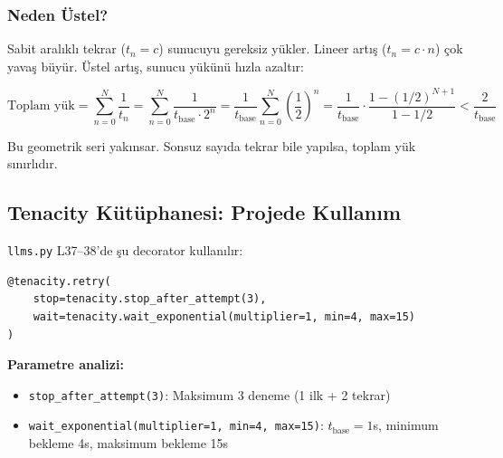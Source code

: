 \subsubsection{Neden \"{U}stel?}

Sabit aral{\i}kl{\i} tekrar ($t_n = c$) sunucuyu gereksiz y\"{u}kler. Lineer art{\i}\c{s} ($t_n = c \cdot n$) \c{c}ok yava\c{s} b\"{u}y\"{u}r. \"{U}stel art{\i}\c{s}, sunucu y\"{u}k\"{u}n\"{u} h{\i}zla azalt{\i}r:

\begin{equation}
\text{Toplam y\"{u}k} = \sum_{n=0}^{N} \frac{1}{t_n} = \sum_{n=0}^{N} \frac{1}{t_{\text{base}} \cdot 2^n} = \frac{1}{t_{\text{base}}} \sum_{n=0}^{N} \left(\frac{1}{2}\right)^n = \frac{1}{t_{\text{base}}} \cdot \frac{1 - (1/2)^{N+1}}{1 - 1/2} < \frac{2}{t_{\text{base}}}
\label{eq:backoff-load}
\end{equation}

Bu geometrik seri yak{\i}nsar. Sonsuz say{\i}da tekrar bile yap{\i}lsa, toplam y\"{u}k s{\i}n{\i}rl{\i}d{\i}r.


\subsection{Tenacity K\"{u}t\"{u}phanesi: Projede Kullan{\i}m}
\label{sec:tenacity}

\texttt{llms.py} L37--38'de \c{s}u decorator kullan{\i}l{\i}r:

\begin{lstlisting}
@tenacity.retry(
    stop=tenacity.stop_after_attempt(3),
    wait=tenacity.wait_exponential(multiplier=1, min=4, max=15)
)
\end{lstlisting}

\textbf{Parametre analizi:}
\begin{itemize}
  \item \texttt{stop\_after\_attempt(3)}: Maksimum 3 deneme (1 ilk + 2 tekrar)
  \item \texttt{wait\_exponential(multiplier=1, min=4, max=15)}: $t_{\text{base}} = 1$s, minimum bekleme 4s, maksimum bekleme 15s
\end{itemize}

